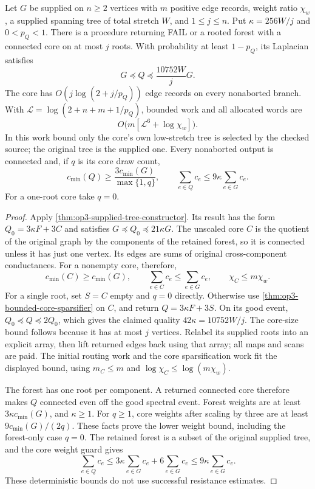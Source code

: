 \begin{theorem}
\label{thm:op3-supplied-tree-sparse-core}
Let $G$ be supplied on $n\geq2$ vertices with $m$ positive edge records,
weight ratio $\chi_w$, a supplied spanning tree of total stretch $W$, and
$1\leq j\leq n$. Put $\kappa=256W/j$ and $0<p_Q<1$.
There is a procedure returning \textnormal{FAIL} or a rooted forest
with a connected core on at most $j$ roots. With probability at least
$1-p_Q$, its Laplacian satisfies
\[
 G\preceq Q\preceq\frac{10752W}{j}G.
\]
The core has $O(j\log(2+j/p_Q))$ edge records on every nonaborted
branch. With $\mathcal L=\log(2+n+m+1/p_Q)$, bounded work and all
allocated words are
\[
 O\bigl(m[\mathcal L^6+\log\chi_w]\bigr).
\]
In this work bound only the core's own low-stretch tree is selected by
the checked source; the original tree is the supplied one. Every
nonaborted output is connected and, if $q$ is its core draw count,
\[
 c_{\min}(Q)\geq\frac{3c_{\min}(G)}{\max\{1,q\}},
 \qquad \sum_{e\in Q}c_e\leq9\kappa\sum_{e\in G}c_e.
\]
For a one-root core take $q=0$.
\end{theorem}
\begin{proof}
Apply \cref{thm:op3-supplied-tree-constructor}. Its result has the form
$Q_0=3\kappa F+3C$ and satisfies
$G\preceq Q_0\preceq21\kappa G$. The unscaled core $C$ is the
quotient of the original graph by the components of the retained
forest, so it is connected unless it has just one vertex. Its edges
are sums of original cross-component conductances. For a nonempty core,
therefore,
\[
 c_{\min}(C)\geq c_{\min}(G),\qquad
 \sum_{e\in C}c_e\leq\sum_{e\in G}c_e,
 \qquad \chi_C\leq m\chi_w.
\]
For a single root, set $S=C$ empty and $q=0$ directly. Otherwise
use \cref{thm:op3-bounded-core-sparsifier} on $C$, and return
$Q=3\kappa F+3S$. On its good event,
$Q_0\preceq Q\preceq2Q_0$, which gives the claimed quality
$42\kappa=10752W/j$. The core-size bound follows because it has at
most $j$ vertices. Relabel its supplied roots into an explicit array,
then lift returned edges back using that array; all maps and scans are
paid. The initial routing work and the core sparsification work fit the
displayed bound, using $m_C\leq m$ and $\log\chi_C\leq\log(m\chi_w)$.

The forest has one root per component. A returned connected core therefore
makes $Q$ connected even off the good spectral event. Forest weights
are at least $3\kappa c_{\min}(G)$, and $\kappa\geq1$.
For $q\geq1$, core weights after scaling by three are at least
$9c_{\min}(G)/(2q)$. These facts prove the lower weight bound, including
the forest-only case $q=0$. The retained forest is a subset of the
original supplied tree, and the core weight guard gives
\[
 \sum_{e\in Q}c_e
 \leq3\kappa\sum_{e\in G}c_e+6\sum_{e\in G}c_e
 \leq9\kappa\sum_{e\in G}c_e.
\]
These deterministic bounds do not use successful resistance estimates.
\end{proof}

